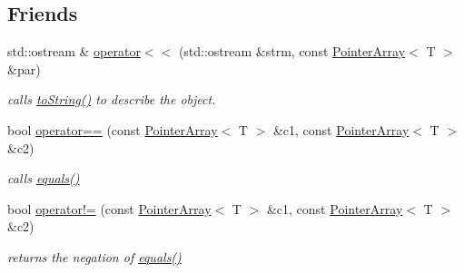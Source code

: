 \subsection*{Friends}
\begin{DoxyCompactItemize}
\item 
\hypertarget{classparray_1_1PointerArray_a081ebddab3580154920d0739f567551d}{std\-::ostream \& \hyperlink{classparray_1_1PointerArray_a081ebddab3580154920d0739f567551d}{operator$<$$<$} (std\-::ostream \&strm, const \hyperlink{classparray_1_1PointerArray}{Pointer\-Array}$<$ T $>$ \&par)}\label{classparray_1_1PointerArray_a081ebddab3580154920d0739f567551d}

\begin{DoxyCompactList}\small\item\em calls \hyperlink{classparray_1_1PointerArray_a4c6e34cad01f5f72dd6c5de917ed3a34}{to\-String()} to describe the object. \end{DoxyCompactList}\item 
\hypertarget{classparray_1_1PointerArray_a050d55aeebf51f02bf59d8352664528d}{bool \hyperlink{classparray_1_1PointerArray_a050d55aeebf51f02bf59d8352664528d}{operator==} (const \hyperlink{classparray_1_1PointerArray}{Pointer\-Array}$<$ T $>$ \&c1, const \hyperlink{classparray_1_1PointerArray}{Pointer\-Array}$<$ T $>$ \&c2)}\label{classparray_1_1PointerArray_a050d55aeebf51f02bf59d8352664528d}

\begin{DoxyCompactList}\small\item\em calls \hyperlink{classparray_1_1PointerArray_a2ca07f329b7568d2bdd4ea50ba153a2b}{equals()} \end{DoxyCompactList}\item 
\hypertarget{classparray_1_1PointerArray_a8ef9d256b362ccc682a1ad998f92beda}{bool \hyperlink{classparray_1_1PointerArray_a8ef9d256b362ccc682a1ad998f92beda}{operator!=} (const \hyperlink{classparray_1_1PointerArray}{Pointer\-Array}$<$ T $>$ \&c1, const \hyperlink{classparray_1_1PointerArray}{Pointer\-Array}$<$ T $>$ \&c2)}\label{classparray_1_1PointerArray_a8ef9d256b362ccc682a1ad998f92beda}

\begin{DoxyCompactList}\small\item\em returns the negation of \hyperlink{classparray_1_1PointerArray_a2ca07f329b7568d2bdd4ea50ba153a2b}{equals()} \end{DoxyCompactList}\end{DoxyCompactItemize}


